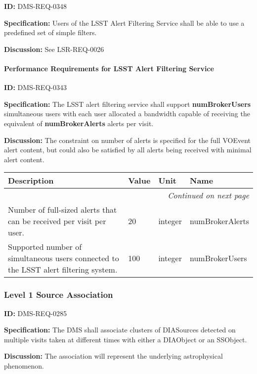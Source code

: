 \documentclass[SE,toc,lsstdraft]{lsstdoc}
\makeatletter
\newcommand{\paramname}[1]{\hspace{0pt}#1}
\newcommand{\unitname}[1]{\hspace{0pt}#1}
\newenvironment{parameters}[0]{%
\setlength\LTleft{0pt}
\setlength\LTright{\fill}
\begin{small}
\begin{longtable}[]{|p{0.5\textwidth}|l|p{0.6in}|p{1.74in}@{}|}

\hline \textbf{Description} & \textbf{Value} & \textbf{Unit} & \textbf{Name} \\ \hline
\endhead

\hline \multicolumn{4}{r}{\emph{Continued on next page}} \\
\endfoot

\hline\hline
\endlastfoot
}{%
\hline
\end{longtable}
\end{small}
}
\makeatother
\begin{document}
\label{DMS-REQ-0348}
\textbf{ID:} DMS-REQ-0348

\textbf{Specification: }Users of the LSST Alert Filtering Service shall be able to use a predefined set of simple filters.

\textbf{Discussion:} See LSR-REQ-0026




\paragraph{Performance Requirements for LSST Alert Filtering Service}\hfill  %

\label{DMS-REQ-0343}
\textbf{ID:} DMS-REQ-0343

\textbf{Specification:} The LSST alert filtering service shall support \textbf{numBrokerUsers} simultaneous users with each user allocated a bandwidth capable of receiving the equivalent of \textbf{numBrokerAlerts} alerts per visit.

\textbf{Discussion:} The constraint on number of alerts is specified for the full VOEvent alert content, but could also be satisfied by all alerts being received with minimal alert content.



\begin{parameters}
 Number of full-sized alerts that can be received per visit per user.
&
20
&
\unitname{%
integer
}
&
\paramname{%
numBrokerAlerts
} \\\hline
Supported number of simultaneous users connected to the LSST alert filtering system.
&
100
&
\unitname{%
integer
}
&
\paramname{%
numBrokerUsers
} \\\hline
\end{parameters}




\subsubsection{Level 1 Source Association}

\label{DMS-REQ-0285}
\textbf{ID:} DMS-REQ-0285

\textbf{Specification:} The DMS shall associate clusters of DIASources detected on multiple visits taken at different times with either a DIAObject or an SSObject.

\textbf{Discussion: }The association will represent the underlying astrophysical phenomenon.
\end{document}
